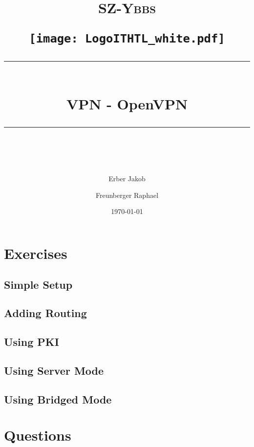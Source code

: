 \documentclass[11pt]{scrartcl} %
\title{	
	\normalfont\normalsize
	\begin{center}
		\begin{minipage}[c]{0.2\textwidth}
			\textsc{\Large SZ-Ybbs}
		\end{minipage}%
		\begin{minipage}[c]{0.1\textwidth}
			\texttt{[image: LogoITHTL\_white.pdf]}
		\end{minipage}
	\end{center}
	\vspace{10pt} %
	\rule{\linewidth}{0.5pt}\\ %
	\vspace{20pt} %
	{\huge VPN - OpenVPN}\\ %
	\vspace{12pt} %
	\rule{\linewidth}{2pt}\\ %
	\vspace{12pt} %
}
\author{\LARGE Erber Jakob \and \LARGE Freunberger Raphael} %
\date{\normalsize\today} %
\begin{document}
\maketitle %

\tableofcontents
\clearpage

\section{Exercises}

\subsection{Simple Setup}


\subsection{Adding Routing}


\subsection{Using PKI}

\subsection{Using Server Mode}

\subsection{Using Bridged Mode}

\section{Questions}
\end{document}
